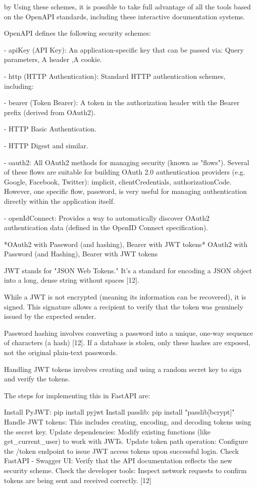 by Using these schemes,  it is possible to take full advantage of all the tools based on the OpenAPI standards, including these interactive documentation systems.

OpenAPI defines the following security schemes:

- apiKey (API Key): An application-specific key that can be passed via: Query parameters, A header ,A cookie.

- http (HTTP Authentication): Standard HTTP authentication schemes, including:

  - bearer (Token Bearer): A token in the authorization header with the Bearer prefix (derived from OAuth2).
  
  - HTTP Basic Authentication.
  
  - HTTP Digest and similar.

- oauth2: All OAuth2 methods for managing security (known as "flows"). Several of these flows are suitable for building OAuth 2.0 authentication providers (e.g. Google, Facebook, Twitter): implicit, clientCredentials, authorizationCode. However, one specific flow, password, is very useful for managing authentication directly within the application itself.

- openIdConnect: Provides a way to automatically discover OAuth2 authentication data (defined in the OpenID Connect specification).

*OAuth2 with Password (and hashing), Bearer with JWT tokens*
OAuth2 with Password (and Hashing), Bearer with JWT tokens

JWT stands for "JSON Web Tokens." It's a standard for encoding a JSON object into a long, dense string without spaces [12].

While a JWT is not encrypted (meaning its information can be recovered), it is signed. This signature allows a recipient to verify that the token was genuinely issued by the expected sender.

Password hashing involves converting a password into a unique, one-way sequence of characters (a hash) [12]. If a database is stolen, only these hashes are exposed, not the original plain-text passwords.

Handling JWT tokens involves creating and using a random secret key to sign and verify the tokens.

The steps for implementing this in FastAPI are:

    Install PyJWT: pip install pyjwt
    Install passlib: pip install "passlib[bcrypt]"
    Handle JWT tokens: This includes creating, encoding, and decoding tokens using the secret key.
    Update dependencies: Modify existing functions (like get_current_user) to work with JWTs.
    Update token path operation: Configure the /token endpoint to issue JWT access tokens upon successful login.
    Check FastAPI - Swagger UI: Verify that the API documentation reflects the new security scheme.
    Check the developer tools: Inspect network requests to confirm tokens are being sent and received correctly. [12]
    
